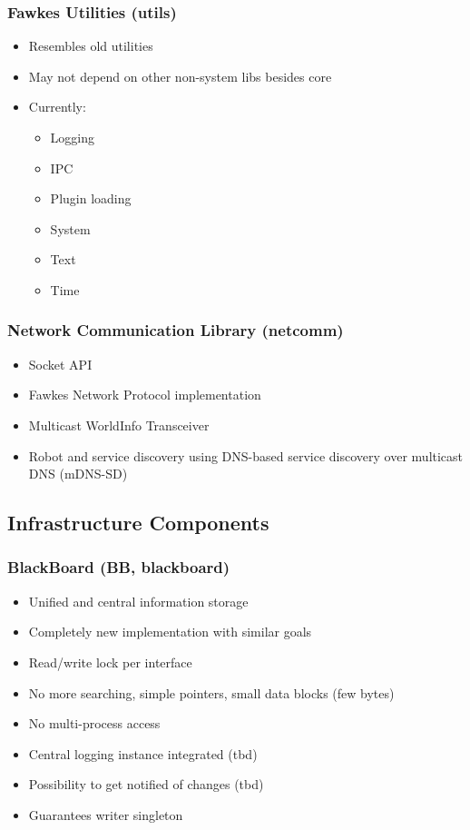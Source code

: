 \begin{frame}
  \frametitle{Fawkes Utilities (utils)}
  \begin{itemize}
  \item Resembles old utilities
  \item May not depend on other non-system libs besides core
  \item Currently:
    \begin{itemize}
    \item Logging
    \item IPC
    \item Plugin loading
    \item System
    \item Text
    \item Time
    \end{itemize}
  \end{itemize}
\end{frame}

\begin{frame}
  \frametitle{Network Communication Library (netcomm)}
  \begin{itemize}
  \item Socket API
  \item Fawkes Network Protocol implementation
  \item Multicast WorldInfo Transceiver
  \item Robot and service discovery using DNS-based service discovery over
    multicast DNS (mDNS-SD)
  \end{itemize}
\end{frame}


\subsection{Infrastructure Components}

\begin{frame}
  \frametitle{BlackBoard (BB, blackboard)}
  \begin{itemize}
  \item Unified and central information storage
  \item Completely new implementation with similar goals
  \item Read/write lock per interface
  \item No more searching, simple pointers, small data blocks (few bytes)
  \item No multi-process access
  \item Central logging instance integrated (tbd)
  \item Possibility to get notified of changes (tbd)
  \item Guarantees writer singleton
  \end{itemize}
\end{frame}

